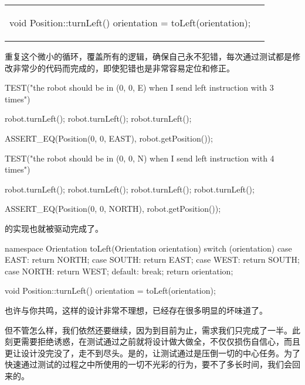 \begin{content}
\begin{tabular}{@{}p{} 
                 | p{}@{}}
\begin{c++}[caption={src/robot-cleaner/Position.cpp}]
void Position::turnLeft()
{
    orientation = toLeft(orientation);
}
\end{c++}
\end{tabular}

重复这个微小的循环，覆盖所有的逻辑，确保自己永不犯错，每次通过测试都是修改非常少的代码而完成的，即使犯错也是非常容易定位和修正。

\begin{leftbar}
\begin{c++}[caption={test/robot-cleaner/TestRobotCleaner.h}]
TEST("the robot should be in (0, 0, E) when I send left instruction with 3 times")
{
    robot.turnLeft();
    robot.turnLeft();
    robot.turnLeft();

    ASSERT_EQ(Position(0, 0, EAST), robot.getPosition());
}

TEST("the robot should be in (0, 0, N) when I send left instruction with 4 times")
{
    robot.turnLeft();
    robot.turnLeft();
    robot.turnLeft();
    robot.turnLeft();
    
    ASSERT_EQ(Position(0, 0, NORTH), robot.getPosition());
}
\end{c++}
\end{leftbar}

的实现也就被驱动完成了。

\begin{leftbar}
\begin{c++}[caption={src/robot-cleaner/Position.cpp}]
namespace
{
    Orientation toLeft(Orientation orientation)
    {
        switch (orientation)
        {
        case EAST:  return NORTH;
        case SOUTH: return EAST;
        case WEST:  return SOUTH;
        case NORTH: return WEST;
        default: break;
        }     
        return orientation;
    }
}

void Position::turnLeft()
{
    orientation = toLeft(orientation);
}
\end{c++}
\end{leftbar}

也许与你共鸣，这样的设计非常不理想，已经存在很多明显的坏味道了。

\begin{enum}
\end{enum}

但不管怎么样，我们依然还要继续，因为到目前为止，需求我们只完成了一半。此刻更需要拒绝诱惑，在测试通过之前就将设计做大做全，不仅仅损伤自信心，而且更让设计没完没了，走不到尽头。是的，让测试通过是压倒一切的中心任务。为了快速通过测试的过程之中所使用的一切不光彩的行为，要不了多长时间，我们会回来的。

\end{content}

